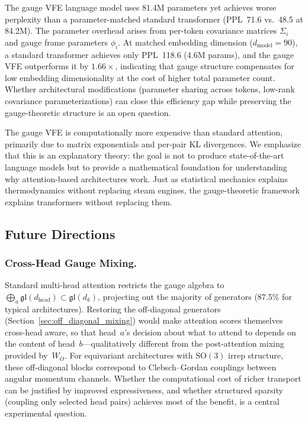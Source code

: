 \documentclass[twoside,11pt]{article}
\begin{document}
The gauge VFE language model uses 81.4M parameters yet achieves worse perplexity than a parameter-matched standard transformer (PPL~71.6 vs.\ 48.5 at 84.2M). The parameter overhead arises from per-token covariance matrices $\Sigma_i$ and gauge frame parameters $\phi_i$. At matched embedding dimension ($d_{\text{model}} = 90$), a standard transformer achieves only PPL~118.6 (4.6M params), and the gauge VFE outperforms it by $1.66\times$, indicating that gauge structure compensates for low embedding dimensionality at the cost of higher total parameter count. Whether architectural modifications (parameter sharing across tokens, low-rank covariance parameterizations) can close this efficiency gap while preserving the gauge-theoretic structure is an open question.

The gauge VFE is computationally more expensive than standard attention, primarily due to matrix exponentials and per-pair KL divergences. We emphasize that this is an explanatory theory: the goal is not to produce state-of-the-art language models but to provide a mathematical foundation for understanding why attention-based architectures work. Just as statistical mechanics explains thermodynamics without replacing steam engines, the gauge-theoretic framework explains transformers without replacing them.

\subsection{Future Directions}

\subsubsection{Cross-Head Gauge Mixing.}

Standard multi-head attention restricts the gauge algebra to $\bigoplus_a \mathfrak{gl}(d_{\mathrm{head}}) \subset \mathfrak{gl}(d_k)$, projecting out the majority of generators (87.5\% for typical architectures). Restoring the off-diagonal generators (Section~\ref{sec:off_diagonal_mixing}) would make attention scores themselves cross-head aware, so that head~$a$'s decision about what to attend to depends on the content of head~$b$---qualitatively different from the post-attention mixing provided by~$W_O$. For equivariant architectures with $\mathrm{SO}(3)$ irrep structure, these off-diagonal blocks correspond to Clebsch--Gordan couplings between angular momentum channels. Whether the computational cost of richer transport can be justified by improved expressiveness, and whether structured sparsity (coupling only selected head pairs) achieves most of the benefit, is a central experimental question.
\end{document}
